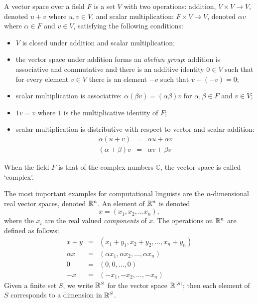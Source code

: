 \documentclass[12pt]{report}
\begin{document}
\begin{defn}
A vector space over a field $F$ is a set $V$ with two operations: addition, $V \times V \rightarrow V$, denoted $u + v$ where $u,v \in V$, and scalar multiplication: $F \times V \rightarrow V$, denoted $\alpha v$ where $\alpha \in F$ and $v \in V$,
satisfying the following conditions:
\begin{itemize}
\item $V$ is closed under addition and scalar multiplication;
\item the vector space under addition forms an \emph{abelian group}: addition is associative and commutative and there is an additive identity $0 \in V$ such that for every element $v \in V$ there is an element $-v$ such that $v + (-v) = 0$;
\item scalar multiplication is associative: $\alpha (\beta v) = (\alpha \beta) v$ for $\alpha, \beta \in F$ and $v \in V$;
\item $1v = v$ where $1$ is the multiplicative identity of $F$;
\item scalar multiplication is distributive with respect to vector and scalar addition:
\begin{eqnarray*}
\alpha(u + v) & = & \alpha u + \alpha v\\
(\alpha + \beta)v & = & \alpha v + \beta v
\end{eqnarray*}
\end{itemize}
When the field $F$ is that of the complex numbers $\mathbb{C}$, the vector space is called `complex'.
\end{defn}

\begin{example}
The most important examples for computational linguists are the $n$-dimensional real vector spaces, denoted $\mathbb{R}^n$. An element of $\mathbb{R}^n$ is denoted
$$x = (x_1,x_2,\ldots x_n),$$
where the $x_i$ are the real valued \emph{components} of $x$. The operations on $\mathbb{R}^n$ are defined as follows:
\begin{eqnarray*}
x + y & = & (x_1 + y_1, x_2 + y_2, \ldots, x_n + y_n)\\
\alpha x & = & (\alpha x_1, \alpha x_2, \ldots, \alpha x_n)\\
0 & = & (0,0,\ldots, 0)\\
-x & = & (-x_1, -x_2, \ldots, -x_n)
\end{eqnarray*}
Given a finite set $S$, we write $\mathbb{R}^S$ for the vector space $\mathbb{R}^{|S|}$; then each element of $S$ corresponds to a dimension in $\mathbb{R}^S$.
\end{example}
\end{document}
